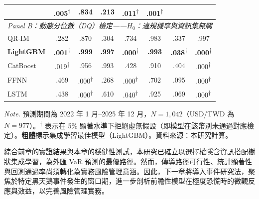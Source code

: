 \begin{table}[htbp]
{\begin{tabular}{lccccccc}
                     & .005\textsuperscript{$\dag$}
                     & .834 & .213
                     & .011\textsuperscript{$\dag$}
                     & .001\textsuperscript{$\dag$} \\
        \hline
        \multicolumn{8}{l}{\textit{Panel B：動態分位數（DQ）檢定——$H_0$：違規機率與資訊集無關}} \\
        \hline
        QR-IM        & .282 & .870 & .304 & .734 & .983 & .337 & .997 \\
        \textbf{LightGBM}
                     & \textbf{.001}\textsuperscript{$\dag$}
                     & \textbf{.999} & \textbf{.997}
                     & \textbf{.000}\textsuperscript{$\dag$}
                     & \textbf{.993}
                     & \textbf{.038}\textsuperscript{$\dag$}
                     & \textbf{.000}\textsuperscript{$\dag$} \\
        CatBoost     & .019\textsuperscript{$\dag$}
                     & .956 & .993 & .428 & .910 & .404
                     & .000\textsuperscript{$\dag$} \\
        FFNN         & .469
                     & .000\textsuperscript{$\dag$}
                     & .268
                     & .000\textsuperscript{$\dag$}
                     & .702 & .095
                     & .000\textsuperscript{$\dag$} \\
        LSTM         & .438
                     & .000\textsuperscript{$\dag$}
                     & .610
                     & .040\textsuperscript{$\dag$}
                     & .925 & .069
                     & .000\textsuperscript{$\dag$} \\
        \hline
    \end{tabular}
    }
 
    \vspace{3mm}
 
    \begin{minipage}{\textwidth}
        \fontsize{9pt}{13pt}\selectfont
        \textit{Note.} 預測期間為 2022 年 1 月--2025 年 12 月，$N = 1{,}042$（USD/TWD 為 $N = 977$）。\textsuperscript{$\dag$} 表示在 5\% 顯著水準下拒絕虛無假設（即模型在該幣別未通過對應檢定）。\textbf{粗體}標示集成學習最佳模型（LightGBM）。資料來源：本研究計算。
    \end{minipage}
\end{table}

綜合前章的實證結果與本章的穩健性測試，本研究已確立以選擇權隱含資訊搭配樹狀集成學習，為外匯 VaR 預測的最優路徑。然而，傳導路徑可行性、統計顯著性與回測通過率尚須轉化為實務風險管理意涵。因此，下一章將導入事件研究法，聚焦於特定黑天鵝事件發生的窗口期，進一步剖析前瞻性模型在極度恐慌時的微觀反應與效益，以完善風險管理實務。